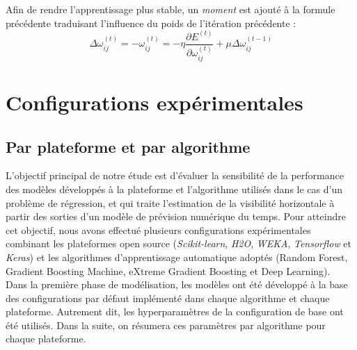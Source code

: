 Afin de rendre l'apprentissage plus stable, un \emph{moment} est ajouté à la formule précédente traduisant l'influence du poids de l'itération précédente :
            \begin{equation}
            \Delta\omega_{ij}^{(t)}= -\omega_{ij}^{(t)}=-\eta \frac{\partial
            E^{(t)}}{\partial \omega_{ij}^{(t)}} + \mu \Delta\omega_{ij}^{(t-1)}
            \end{equation}

\section{Configurations expérimentales}\label{config}
\subsection{Par plateforme et par algorithme}\label{config_pl_algo}
L'objectif principal de notre étude est d'évaluer la sensibilité de la performance des modèles développés à la plateforme et l'algorithme utilisés dans le cas d'un problème de régression, et qui traite l'estimation de la visibilité horizontale à partir des sorties d'un modèle de prévision numérique du temps. Pour atteindre cet objectif, nous avons effectué plusieurs configurations expérimentales combinant les plateformes open source (\textit{Scikit-learn}, \textit{H2O}, \textit{WEKA}, \textit{Tensorflow} et \textit{Keras}) et les algorithmes d'apprentissage automatique adoptés (Random Forest, Gradient Boosting Machine, eXtreme Gradient Boosting et Deep Learning).\\

Dans la première phase de modélisation, les modèles ont été développé à la base des configurations par défaut implémenté dans chaque algorithme et chaque plateforme. Autrement dit, les hyperparamètres de la configuration de base ont été utilisés. Dans la suite, on résumera ces paramètres par algorithme pour chaque plateforme.\\



